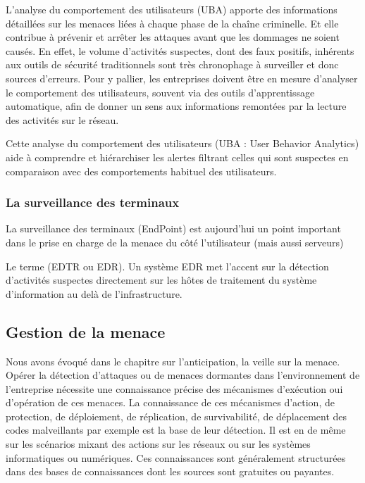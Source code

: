 
L’analyse du comportement des utilisateurs (UBA) apporte des informations détaillées sur les menaces liées à chaque phase de la chaîne criminelle. Et elle contribue à prévenir et arrêter les attaques avant que les dommages ne soient causés. En effet, le volume d’activités suspectes, dont des faux positifs, inhérents aux outils de sécurité traditionnels sont très chronophage à surveiller et donc sources d’erreurs.
Pour y pallier, les entreprises doivent être en mesure d’analyser le comportement des utilisateurs, souvent via des outils d'apprentissage automatique, afin de donner un sens aux informations remontées par la lecture des activités sur le réseau.

Cette analyse du comportement des utilisateurs (UBA : User Behavior Analytics) aide à  comprendre et hiérarchiser les alertes filtrant celles qui sont suspectes en comparaison avec des comportements habituel des utilisateurs.

\subsubsection{La surveillance des terminaux}

La surveillance des terminaux (EndPoint) est aujourd'hui un point important dans le prise en charge de la menace du côté l'utilisateur (mais aussi serveurs)

 Le  terme  (EDTR ou EDR). Un système EDR met  l’accent sur la détection d’activités suspectes directement sur les hôtes de traitement du système d'information au delà de l'infrastructure. 


\subsection{Gestion de la menace}

Nous avons évoqué dans le chapitre sur l'anticipation, la veille sur la menace. 
Opérer la détection d'attaques ou de menaces dormantes dans l'environnement de l'entreprise nécessite une connaissance précise des mécanismes d'exécution oui d'opération de ces menaces.
La connaissance de ces mécanismes d'action, de protection, de déploiement, de réplication, de survivabilité, de déplacement des codes malveillants par exemple est la base de leur détection. Il est en de même sur les scénarios mixant des actions sur les réseaux ou sur les systèmes informatiques ou numériques.
Ces connaissances sont généralement structurées dans des bases de connaissances dont les sources sont gratuites ou payantes.

